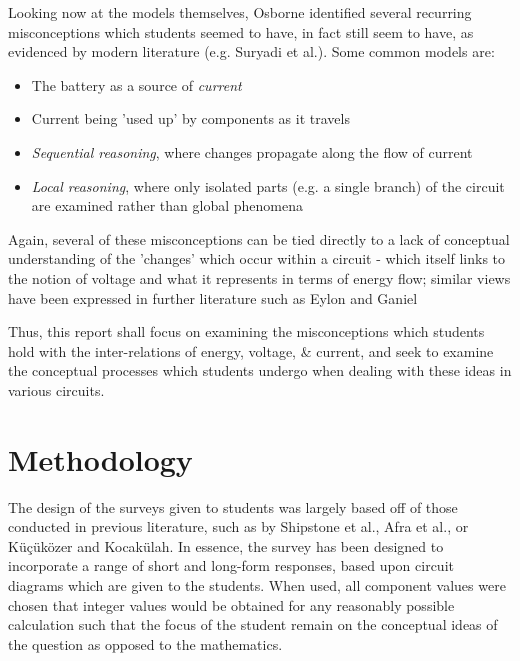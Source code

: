 \documentclass[a4paper,openany,nobib]{tufte-book}
\begin{document}
Looking now at the models themselves, Osborne\autocite{osb} identified several recurring misconceptions which students seemed to have, in fact still seem to have, as evidenced by modern literature (e.g. Suryadi et al.\autocite{suryadi2020}). 
Some common models are:
\begin{itemize}
	\item The battery as a source of \emph{current} 
	\item Current being 'used up' by components as it travels
	\item \emph{Sequential reasoning}, where changes propagate along the flow of current
	\item \emph{Local reasoning}, where only isolated parts (e.g. a single branch) of the circuit are examined rather than global phenomena
\end{itemize}
Again, several of these misconceptions can be tied directly to a lack of conceptual understanding of the 'changes' which occur within a circuit - which itself links to the notion of voltage and what it represents in terms of energy flow; similar views have been expressed in further literature such as Eylon and Ganiel\autocite{eylon1990}

Thus, this report shall focus on examining the misconceptions which students hold with the inter-relations of energy, voltage, \& current, and seek to examine the conceptual processes which students undergo when dealing with these ideas in various circuits.
\newpage
\chapter{Methodology}%
The design of the surveys given to students was largely based off of those conducted in previous literature, such as by Shipstone et al., Afra et al., or Küçüközer and Kocakülah\autocite{shipstone_europe,afra2009,kucu2007}. In essence, the survey has been designed to incorporate a range of short and long-form responses, based upon circuit diagrams which are given to the students. When used, all component values were chosen that integer values would be obtained for any reasonably possible calculation such that the focus of the student remain on the conceptual ideas of the question as opposed to the mathematics.
\end{document}
